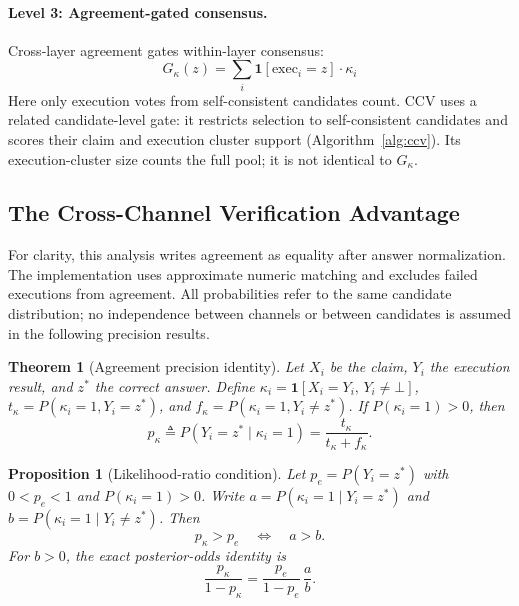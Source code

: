 \documentclass{article}
\newtheorem{proposition}{Proposition}
\newtheorem{theorem}{Theorem}
\begin{document}
\paragraph{Level 3: Agreement-gated consensus.} Cross-layer agreement gates within-layer consensus:
\begin{equation}
    G_\kappa(z) = \sum_i \mathbf{1}[\text{exec}_i = z] \cdot \kappa_i
\end{equation}
Here only execution votes from self-consistent candidates count. CCV uses a related candidate-level gate: it restricts selection to self-consistent candidates and scores their claim and execution cluster support (Algorithm~\ref{alg:ccv}). Its execution-cluster size counts the full pool; it is not identical to $G_\kappa$.

\subsection{The Cross-Channel Verification Advantage}
\label{sec:precision}

For clarity, this analysis writes agreement as equality after answer normalization. The implementation uses approximate numeric matching and excludes failed executions from agreement. All probabilities refer to the same candidate distribution; no independence between channels or between candidates is assumed in the following precision results.

\begin{theorem}[Agreement precision identity]
\label{thm:accuracy}
Let $X_i$ be the claim, $Y_i$ the execution result, and $z^*$ the correct answer. Define $\kappa_i=\mathbf{1}[X_i=Y_i,\,Y_i\neq\bot]$, $t_\kappa=P(\kappa_i=1,Y_i=z^*)$, and $f_\kappa=P(\kappa_i=1,Y_i\neq z^*)$. If $P(\kappa_i=1)>0$, then
\begin{equation}
    p_\kappa \triangleq P(Y_i=z^*\mid\kappa_i=1)
    =\frac{t_\kappa}{t_\kappa+f_\kappa}.
    \label{eq:precision-identity}
\end{equation}
\end{theorem}

\begin{proposition}[Likelihood-ratio condition]
\label{prop:likelihood}
Let $p_e=P(Y_i=z^*)$ with $0<p_e<1$ and $P(\kappa_i=1)>0$. Write $a=P(\kappa_i=1\mid Y_i=z^*)$ and $b=P(\kappa_i=1\mid Y_i\neq z^*)$. Then
\begin{equation}
    p_\kappa>p_e \quad\Longleftrightarrow\quad a>b.
    \label{eq:likelihood-condition}
\end{equation}
For $b>0$, the exact posterior-odds identity is
\begin{equation}
    \frac{p_\kappa}{1-p_\kappa}
    =\frac{p_e}{1-p_e}\,\frac{a}{b}.
    \label{eq:posterior-odds}
\end{equation}
\end{proposition}
\end{document}
